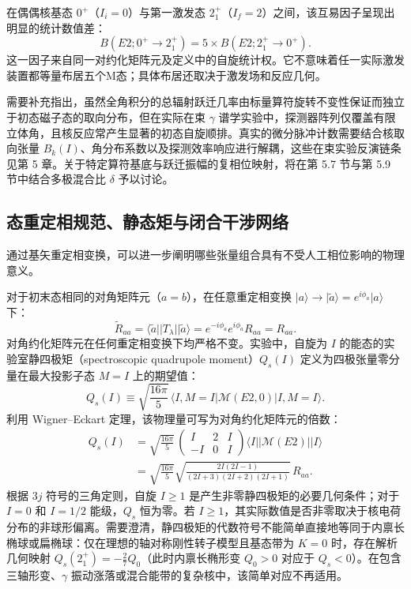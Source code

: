在偶偶核基态 $0^+$（$I_i = 0$）与第一激发态 $2_1^+$（$I_f = 2$）之间，该互易因子呈现出明显的统计数值差：
\begin{equation}\label{eq:2-1-18}
B(E2; 0^+ \to 2_1^+) = 5 \times B(E2; 2_1^+ \to 0^+).
\end{equation}
这一因子来自同一对约化矩阵元及定义中的自旋统计权。它不意味着任一实际激发装置都等量布居五个M态；具体布居还取决于激发场和反应几何。

需要补充指出，虽然全角积分的总辐射跃迁几率由标量算符旋转不变性保证而独立于初态磁子态的取向分布，但在实际在束 $\gamma$ 谱学实验中，探测器阵列仅覆盖有限立体角，且核反应常产生显著的初态自旋顺排。真实的微分脉冲计数需要结合核取向张量 $B_k(I)$、角分布系数以及探测效率响应进行解耦，这些在束实验反演链条见第 5 章。关于特定算符基底与跃迁振幅的复相位映射，将在第 5.7 节与第 5.9 节中结合多极混合比 $\delta$ 予以讨论。



\subsection{态重定相规范、静态矩与闭合干涉网络}\label{sec:2-1-4}


通过基矢重定相变换，可以进一步阐明哪些张量组合具有不受人工相位影响的物理意义。

对于初末态相同的对角矩阵元（$a = b$），在任意重定相变换 $|a\rangle \to |\tilde{a}\rangle = e^{i\phi_a} |a\rangle$ 下：
\begin{equation}\label{eq:2-1-19}
\tilde{R}_{aa} = \langle \tilde{a} || T_\lambda || \tilde{a} \rangle = e^{-i\phi_a} e^{i\phi_a} R_{aa} = R_{aa}.
\end{equation}
对角约化矩阵元在任何重定相变换下均严格不变。实验中，自旋为 $I$ 的能态的实验室静四极矩（spectroscopic quadrupole moment）$Q_s(I)$ 定义为四极张量零分量在最大投影子态 $M = I$ 上的期望值：
\begin{equation}\label{eq:2-1-20}
Q_s(I) \equiv \sqrt{\frac{16\pi}{5}} \, \langle I, M=I | \mathcal{M}(E2, 0) | I, M=I \rangle.
\end{equation}
利用 Wigner–Eckart 定理，该物理量可写为对角约化矩阵元的倍数：
\begin{equation}\label{eq:2-1-21}
\begin{aligned}
Q_s(I) &= \sqrt{\frac{16\pi}{5}} \, \begin{pmatrix} I & 2 & I \\ -I & 0 & I \end{pmatrix} \langle I || \mathcal{M}(E2) || I \rangle \\
&= \sqrt{\frac{16\pi}{5}} \sqrt{\frac{2I(2I-1)}{(2I+3)(2I+2)(2I+1)}} \, R_{aa}.
\end{aligned}
\end{equation}
根据 $3j$ 符号的三角定则，自旋 $I \ge 1$ 是产生非零静四极矩的必要几何条件；对于 $I = 0$ 和 $I = 1/2$ 能级，$Q_s$ 恒为零。若 $I \ge 1$，其实际数值是否非零取决于核电荷分布的非球形偏离。需要澄清，静四极矩的代数符号不能简单直接地等同于内禀长椭球或扁椭球：仅在理想的轴对称刚性转子模型且基态带为 $K=0$ 时，存在解析几何映射 $Q_s(2_1^+) = -\frac{2}{7} Q_0$（此时内禀长椭形变 $Q_0 > 0$ 对应于 $Q_s < 0$）。在包含三轴形变、$\gamma$ 振动涨落或混合能带的复杂核中，该简单对应不再适用。

